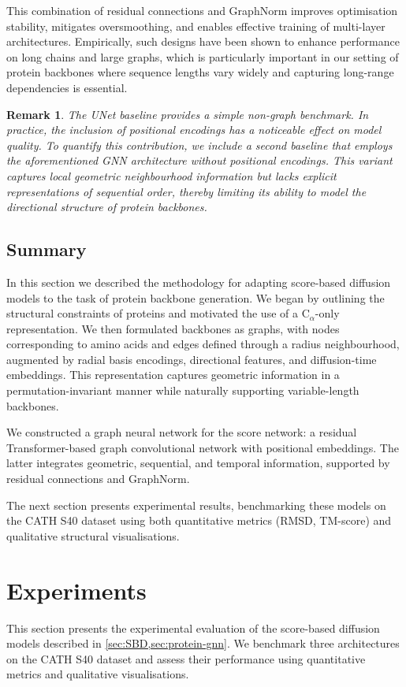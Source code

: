 \documentclass[a4paper,12pt]{article}
\newtheorem{remark}{Remark}[section]
\begin{document}
This combination of residual connections and GraphNorm improves optimisation stability, mitigates oversmoothing, and enables effective training of multi-layer architectures. Empirically, such designs have been shown to enhance performance on long chains and large graphs, which is particularly important in our setting of protein backbones where sequence lengths vary widely and capturing long-range dependencies is essential.
\begin{remark}
    The UNet baseline provides a simple non-graph benchmark. In practice, the inclusion of positional encodings has a noticeable effect on model quality. To quantify this contribution, we include a second baseline that employs the aforementioned GNN architecture without positional encodings. This variant captures local geometric neighbourhood information but lacks explicit representations of sequential order, thereby limiting its ability to model the directional structure of protein backbones.
\end{remark}

\subsection{Summary}\label{subsec:method-summary}
In this section we described the methodology for adapting score-based diffusion models to the task of protein backbone generation. We began by outlining the structural constraints of proteins and motivated the use of a C\(_\alpha\)-only representation. We then formulated backbones as graphs, with nodes corresponding to amino acids and edges defined through a radius neighbourhood, augmented by radial basis encodings, directional features, and diffusion-time embeddings. This representation captures geometric information in a permutation-invariant manner while naturally supporting variable-length backbones.

We constructed a graph neural network for the score network: a residual Transformer-based graph convolutional network with positional embeddings. The latter integrates geometric, sequential, and temporal information, supported by residual connections and GraphNorm.

The next section presents experimental results, benchmarking these models on the CATH S40 dataset using both quantitative metrics (RMSD, TM-score) and qualitative structural visualisations.

\clearpage

\section{Experiments}\label{sec:Experiments}
This section presents the experimental evaluation of the score-based diffusion models described in \cref{sec:SBD,sec:protein-gnn}. We benchmark three architectures on the CATH S40 dataset and assess their performance using quantitative metrics and qualitative visualisations. 
\end{document}
